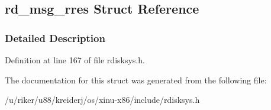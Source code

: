 \hypertarget{structrd__msg__rres}{}\subsection{rd\+\_\+msg\+\_\+rres Struct Reference}
\label{structrd__msg__rres}


\subsubsection{Detailed Description}


Definition at line 167 of file rdisksys.\+h.



The documentation for this struct was generated from the following file\+:\begin{DoxyCompactItemize}
\item 
/u/riker/u88/kreiderj/os/xinu-\/x86/include/rdisksys.\+h\end{DoxyCompactItemize}
